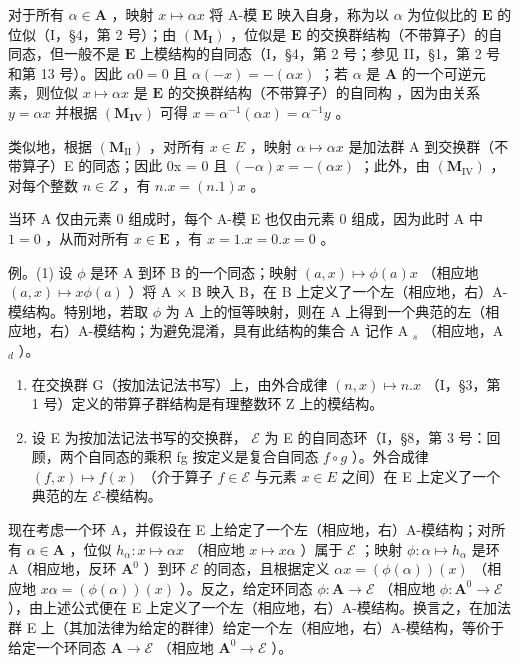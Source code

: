 对于所有 \(\alpha \in \mathbf{A}\) ，映射 \(x \mapsto \alpha x\) 将 A-模 \(\mathbf{E}\) 映入自身，称为以 \(\alpha\) 为位似比的 \(\mathbf{E}\) 的位似（I，§4，第 2 号）；由 \((\mathbf{M}_{\mathbf{I}})\) ，位似是 \(\mathbf{E}\) 的交换群结构（不带算子）的自同态，但一般不是 \(\mathbf{E}\) 上模结构的自同态（I，§4，第 2 号；参见 II，§1，第 2 号和第 13 号）。因此 \(\alpha 0 = 0\) 且 \(\alpha(-x) = -(\alpha x)\) ；若 \(\alpha\) 是 \(\mathbf{A}\) 的一个可逆元素，则位似 \(x \mapsto \alpha x\) 是 \(\mathbf{E}\) 的交换群结构（不带算子）的自同构 ，因为由关系 \(y = \alpha x\) 并根据 \((\mathbf{M}_{\mathbf{IV}})\) 可得 \(x = \alpha^{-1}(\alpha x) = \alpha^{-1}y\) 。

类似地，根据 \((\mathbf{M}_{\mathrm{II}})\) ，对所有 \(x \in E\) ，映射 \(\alpha \mapsto \alpha x\) 是加法群 A 到交换群（不带算子）E 的同态；因此 0x = 0 且 \((- \alpha)x = -(\alpha x)\) ；此外，由 \((\mathbf{M}_{\mathrm{IV}})\) ，对每个整数 \(n \in Z\) ，有 \(n.x = (n.1)x\) 。

当环 A 仅由元素 0 组成时，每个 A-模 E 也仅由元素 0 组成，因为此时 A 中 \(1 = 0\) ，从而对所有 \(x \in \mathbf{E}\) ，有 \(x = 1.x = 0.x = 0\) 。

例。(1) 设 \(\phi\) 是环 A 到环 B 的一个同态；映射 \((a, x) \mapsto \phi(a)x\) （相应地 \((a, x) \mapsto x\phi(a)\) ）将 A × B 映入 B，在 B 上定义了一个左（相应地，右）A-模结构。特别地，若取 \(\phi\) 为 A 上的恒等映射，则在 A 上得到一个典范的左（相应地，右）A-模结构；为避免混淆，具有此结构的集合 A 记作 A \(_s\) （相应地，A \(_d\) ）。

\begin{enumerate}
\def\labelenumi{(\arabic{enumi})}
\setcounter{enumi}{1}
\item
  在交换群 G（按加法记法书写）上，由外合成律 \((n, x) \mapsto n.x\) （I，§3，第 1 号）定义的带算子群结构是有理整数环 Z 上的模结构。
\item
  设 E 为按加法记法书写的交换群， \(\mathcal{E}\) 为 E 的自同态环（I，§8，第 3 号：回顾，两个自同态的乘积 fg 按定义是复合自同态 \(f \circ g\) ）。外合成律 \((f, x) \mapsto f(x)\) （介于算子 \(f \in \mathcal{E}\) 与元素 \(x \in E\) 之间）在 E 上定义了一个典范的左 \(\mathcal{E}\)-模结构。
\end{enumerate}

现在考虑一个环 A，并假设在 E 上给定了一个左（相应地，右）A-模结构；对所有 \(\alpha \in \mathbf{A}\) ，位似 \(h_{\alpha}: x \mapsto \alpha x\) （相应地 \(x \mapsto x\alpha\) ）属于 \(\mathcal{E}\) ；映射 \(\phi: \alpha \mapsto h_{\alpha}\) 是环 A（相应地，反环 \(\mathbf{A}^0\) ）到环 \(\mathcal{E}\) 的同态，且根据定义 \(\alpha x = (\phi(\alpha))(x)\) （相应地 \(x\alpha = (\phi(\alpha))(x)\) ）。反之，给定环同态 \(\phi: \mathbf{A} \to \mathcal{E}\) （相应地 \(\phi: \mathbf{A}^0 \to \mathcal{E}\) ），由上述公式便在 E 上定义了一个左（相应地，右）A-模结构。换言之，在加法群 E 上（其加法律为给定的群律）给定一个左（相应地，右）A-模结构，等价于给定一个环同态 \(\mathbf{A} \to \mathcal{E}\) （相应地 \(\mathbf{A}^0 \to \mathcal{E}\) ）。

